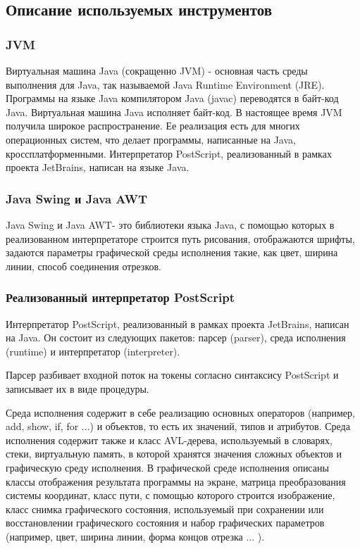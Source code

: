 \documentclass[14pt]{extarticle}
\begin{document}
		
	\subsection{Описание используемых инструментов }
		
		\subsubsection*{JVM}
	
		Виртуальная машина Java (сокращенно JVM) - основная часть среды выполнения для Java, так называемой Java Runtime Environment (JRE). Программы на языке Java компилятором Java (javac) переводятся в байт-код Java. Виртуальная машина Java исполняет байт-код. В настоящее время JVM получила широкое распространение. Ее реализация есть для многих операционных систем, что делает программы, написанные на Java, кроссплатформенными. Интерпретатор PostScript, реализованный в рамках проекта JetBrains, написан на языке Java.
		\subsubsection*{Java Swing и Java AWT}
		Java Swing и Java AWT- это библиотеки языка Java, с помощью которых в реализованном интерпретаторе строится путь рисования, отображаются шрифты, задаются параметры графической среды исполнения такие, как цвет, ширина линии, способ соединения отрезков. 
		\subsubsection*{ Реализованный интерпретатор PostScript }
		Интерпретатор PostScript, реализованный в рамках проекта JetBrains, написан на Java. Он состоит из следующих пакетов: парсер (parser), среда исполнения (runtime) и интерпретатор (interpreter). 
		
		Парсер разбивает входной поток на токены согласно синтаксису PostScript и записывает их в виде процедуры.
		
		Среда исполнения содержит в себе реализацию основных операторов (например, add, show, if, for ...) и объектов, то есть их значений, типов и атрибутов. Среда исполнения содержит также и класс AVL-дерева, используемый в словарях, стеки, виртуальную память, в которой хранятся значения сложных объектов и графическую среду исполнения. В графической среде исполнения описаны классы отображения результата программы на экране, матрица преобразования системы координат, класс пути, с помощью которого строится изображение, класс снимка графического состояния, используемый при сохранении или восстановлении графического состояния и набор графических параметров (например, цвет, ширина линии, форма концов отрезка ... ).
		
\end{document}
